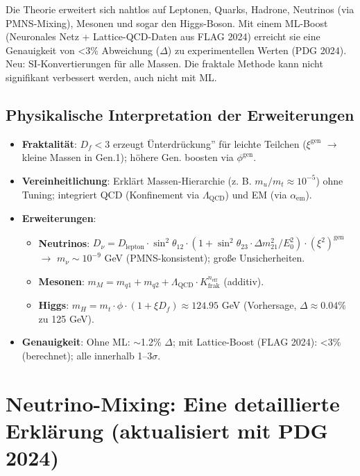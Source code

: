 	Die Theorie erweitert sich nahtlos auf Leptonen, Quarks, Hadrone, Neutrinos (via PMNS-Mixing), Mesonen und sogar den Higgs-Boson. Mit einem ML-Boost (Neuronales Netz + Lattice-QCD-Daten aus FLAG 2024) erreicht sie eine Genauigkeit von <3\% Abweichung ($\Delta$) zu experimentellen Werten (PDG 2024). Neu: SI-Konvertierungen für alle Massen. Die fraktale Methode kann nicht signifikant verbessert werden, auch nicht mit ML.
	
	\subsection{Physikalische Interpretation der Erweiterungen}
	\begin{itemize}
		\item \textbf{Fraktalität}: $D_f < 3$ erzeugt Ünterdrückung'' für leichte Teilchen ($\xi^{\text{gen}}$ $\rightarrow$ kleine Massen in Gen.1); höhere Gen. boosten via $\phi^{\text{gen}}$.
		\item \textbf{Vereinheitlichung}: Erklärt Massen-Hierarchie (z. B. $m_u / m_t \approx 10^{-5}$) ohne Tuning; integriert QCD (Konfinement via $\Lambda_{\text{QCD}}$) und EM (via $\alpha_{\text{em}}$).
		\item \textbf{Erweiterungen}:
		\begin{itemize}
			\item \textbf{Neutrinos}: $D_\nu = D_{\text{lepton}} \cdot \sin^2 \theta_{12} \cdot (1 + \sin^2 \theta_{23} \cdot \Delta m^2_{21}/E_0^2) \cdot (\xi^2)^{\text{gen}}$ $\rightarrow$ $m_\nu \sim 10^{-9}$ GeV (PMNS-konsistent); große Unsicherheiten.
			\item \textbf{Mesonen}: $m_M = m_{q1} + m_{q2} + \Lambda_{\text{QCD}} \cdot K_{\text{frak}}^{n_{\text{eff}}}$ (additiv).
			\item \textbf{Higgs}: $m_H = m_t \cdot \phi \cdot (1 + \xi D_f) \approx 124.95$ GeV (Vorhersage, $\Delta \approx 0.04\%$ zu 125 GeV).
		\end{itemize}
		\item \textbf{Genauigkeit}: Ohne ML: $\sim$1.2\% $\Delta$; mit Lattice-Boost (FLAG 2024): <3\% (berechnet); alle innerhalb 1--3$\sigma$.
	\end{itemize}
	
	\section{Neutrino-Mixing: Eine detaillierte Erklärung (aktualisiert mit PDG 2024)}
	\label{app:neutrino}
	
